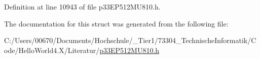Definition at line 10943 of file p33\+E\+P512\+M\+U810.\+h.



The documentation for this struct was generated from the following file\+:\begin{DoxyCompactItemize}
\item 
C\+:/\+Users/00670/\+Documents/\+Hochschule/\+\_\+\+Tier1/73304\+\_\+\+Technische\+Informatik/\+Code/\+Hello\+World4.\+X/\+Literatur/\hyperlink{p33_e_p512_m_u810_8h}{p33\+E\+P512\+M\+U810.\+h}\end{DoxyCompactItemize}
